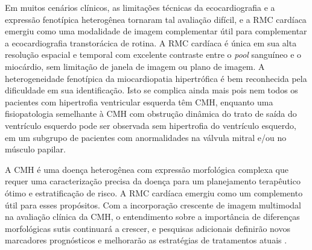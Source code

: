 Em muitos cenários clínicos, as limitações técnicas da ecocardiografia e a expressão fenotípica heterogênea tornaram tal avaliação difícil, e a \gls{RMC} cardíaca emergiu como uma modalidade de imagem complementar útil para complementar a ecocardiografia transtorácica de rotina. A \gls{RMC} cardíaca é única em sua alta resolução espacial e temporal com excelente contraste entre o \textit{pool} sanguíneo e o miocárdio, sem limitação de janela de imagem ou plano de imagem.
A heterogeneidade fenotípica da miocardiopatia hipertrófica é bem reconhecida pela dificuldade em sua identificação. Isto se complica ainda mais pois nem todos os pacientes com hipertrofia ventricular esquerda têm CMH, enquanto uma fisiopatologia semelhante à CMH com obstrução dinâmica do trato de saída do ventrículo esquerdo pode ser observada sem hipertrofia do ventrículo esquerdo, em um subgrupo de pacientes com anormalidades na válvula mitral e/ou no músculo papilar.

A CMH é uma doença heterogênea com expressão morfológica complexa que requer uma caracterização precisa da doença para um planejamento terapêutico ótimo e estratificação de risco. A \gls{RMC} cardíaca emergiu como um complemento útil para esses propósitos. Com a incorporação crescente de imagem multimodal na avaliação clínica da CMH, o entendimento sobre a importância de diferenças morfológicas sutis continuará a crescer, e pesquisas adicionais definirão novos marcadores prognósticos e melhorarão as estratégias de tratamentos atuais \cite{toCardiacMagneticResonance2011c}.






